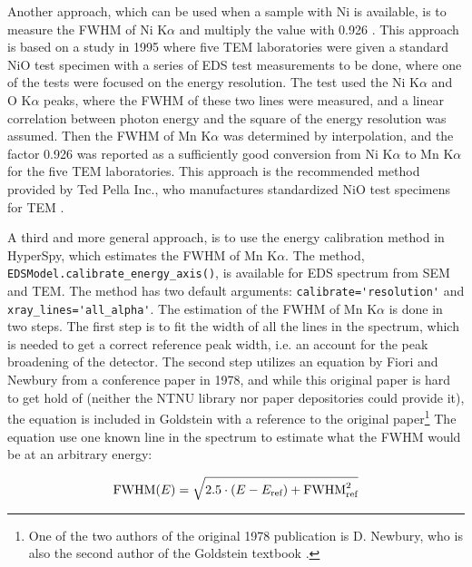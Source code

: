 Another approach, which can be used when a sample with Ni is available, is to measure the FWHM of Ni K$\alpha$ and multiply the value with 0.926 \cite{bennett_egerton_1995}.
This approach is based on a study in 1995 \cite{bennett_egerton_1995} where five TEM laboratories were given a standard NiO test specimen with a series of EDS test measurements to be done, where one of the tests were focused on the energy resolution.
The test used the Ni K$\alpha$ and O K$\alpha$ peaks, where the FWHM of these two lines were measured, and a linear correlation between photon energy and the square of the energy resolution was assumed.
Then the FWHM of Mn K$\alpha$ was determined by interpolation, and the factor 0.926 was reported as a sufficiently good conversion from Ni K$\alpha$ to Mn K$\alpha$ for the five TEM laboratories.
This approach is the recommended method provided by Ted Pella Inc., who manufactures standardized NiO test specimens for TEM \cite{egerton_nio_characterization_1994,ted_pella_nio_tem_2019}.


A third and more general approach, is to use the energy calibration method in HyperSpy, which estimates the FWHM of Mn K$\alpha$.
The method, \verb|EDSModel.calibrate_energy_axis()|, is available for EDS spectrum from SEM and TEM.
The method has two default arguments: \verb|calibrate='resolution'| and \verb|xray_lines='all_alpha'|.
The estimation of the FWHM of Mn K$\alpha$ is done in two steps.
The first step is to fit the width of all the lines in the spectrum, which is needed to get a correct reference peak width, i.e. an account for the peak broadening of the detector.
The second step utilizes an equation by Fiori and Newbury from a conference paper in 1978, and while this original paper is hard to get hold of (neither the NTNU library nor paper depositories could provide it), the equation is included in Goldstein \cite[Ch. 16.1.1]{goldstein_scanning_2018} with a reference to the original paper\footnote{One of the two authors of the original 1978 publication is D. Newbury, who is also the second author of the Goldstein textbook \cite{goldstein_scanning_2018}.}
The equation use one known line in the spectrum to estimate what the FWHM would be at an arbitrary energy:

\begin{equation}
    \label{eq:estimateFWHM}
    \textnormal{FWHM}(E) =  \sqrt{2.5 \cdot (E - E_\textnormal{ref}) + \textnormal{FWHM}^2_{\textnormal{ref}}}
\end{equation}

